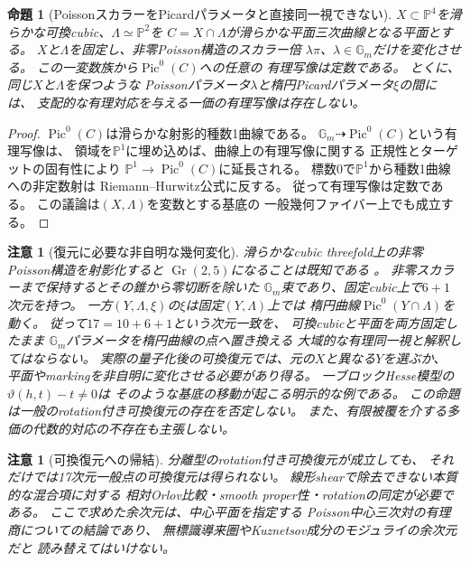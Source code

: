 \documentclass[11pt,a4paper]{ltjsarticle}
\numberwithin{equation}{section}
\newtheorem{proposition}[theorem]{命題}
\newtheorem{remark}[theorem]{注意}
\newcommand{\PP}{\mathbb P}
\begin{document}
\begin{proposition}[PoissonスカラーをPicardパラメータと直接同一視できない]\label{prop:poisson-picard-obstruction}
$X\subset\PP^4$を滑らかな可換cubic、$\Lambda\simeq\PP^2$を
$C=X\cap\Lambda$が滑らかな平面三次曲線となる平面とする。
$X$と$\Lambda$を固定し、非零Poisson構造のスカラー倍
$\lambda\pi$、$\lambda\in\mathbb G_m$だけを変化させる。
この一変数族から$\operatorname{Pic}^0(C)$への任意の
有理写像は定数である。
とくに、同じ$X$と$\Lambda$を保つような
Poissonパラメータ$\lambda$と楕円Picardパラメータ$\xi$の間には、
支配的な有理対応を与える一価の有理写像は存在しない。
\end{proposition}
\begin{proof}
$\operatorname{Pic}^0(C)$は滑らかな射影的種数1曲線である。
$\mathbb G_m\dashrightarrow\operatorname{Pic}^0(C)$という有理写像は、
領域を$\PP^1$に埋め込めば、曲線上の有理写像に関する
正規性とターゲットの固有性により
$\PP^1\to\operatorname{Pic}^0(C)$に延長される。
標数0で$\PP^1$から種数1曲線への非定数射は
Riemann--Hurwitz公式に反する。
従って有理写像は定数である。
この議論は$(X,\Lambda)$を変数とする基底の
一般幾何ファイバー上でも成立する。
\end{proof}
\begin{remark}[復元に必要な非自明な幾何変化]\label{rem:picard-obstruction-scope}
滑らかなcubic threefold上の非零Poisson構造を射影化すると
$\operatorname{Gr}(2,5)$になることは既知である
\cite{LPT,Mayanskiy}。
非零スカラーまで保持するとその錐から零切断を除いた
$\mathbb G_m$束であり、固定cubic上で$6+1$次元を持つ。
一方$(Y,\Lambda,\xi)$の$\xi$は固定$(Y,\Lambda)$上では
楕円曲線$\operatorname{Pic}^0(Y\cap\Lambda)$を動く。
従って$17=10+6+1$という次元一致を、
可換cubicと平面を両方固定したまま
$\mathbb G_m$パラメータを楕円曲線の点へ置き換える
大域的な有理同一視と解釈してはならない。
実際の量子化後の可換復元では、元の$X$と異なる$Y$を選ぶか、
平面やmarkingを非自明に変化させる必要があり得る。
一ブロックHesse模型の$\vartheta(h,t)-t\ne0$は
そのような基底の移動が起こる明示的な例である。
この命題は一般のrotation付き可換復元の存在を否定しない。
また、有限被覆を介する多価の代数的対応の不存在も主張しない。
\end{remark}

\begin{remark}[可換復元への帰結]
\label{rem:split-implication}
分離型のrotation付き可換復元が成立しても、
それだけでは17次元一般点の可換復元は得られない。
線形shearで除去できない本質的な混合項に対する
相対Orlov比較・smooth proper性・rotationの同定が必要である。
ここで求めた余次元は、中心平面を指定する
Poisson中心三次対の\emph{有理商}についての結論であり、
無標識導来圏やKuznetsov成分のモジュライの余次元だと
読み替えてはいけない。
\end{remark}
\end{document}
